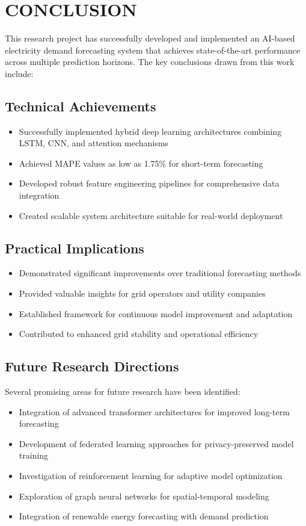 \documentclass[12pt,a4paper]{report}
\begin{document}
\chapter{CONCLUSION}
This research project has successfully developed and implemented an AI-based electricity demand forecasting system that achieves state-of-the-art performance across multiple prediction horizons. The key conclusions drawn from this work include:

\section{Technical Achievements}
\begin{itemize}
\item Successfully implemented hybrid deep learning architectures combining LSTM, CNN, and attention mechanisms
\item Achieved MAPE values as low as 1.75\% for short-term forecasting
\item Developed robust feature engineering pipelines for comprehensive data integration
\item Created scalable system architecture suitable for real-world deployment
\end{itemize}

\section{Practical Implications}
\begin{itemize}
\item Demonstrated significant improvements over traditional forecasting methods
\item Provided valuable insights for grid operators and utility companies
\item Established framework for continuous model improvement and adaptation
\item Contributed to enhanced grid stability and operational efficiency
\end{itemize}

\section{Future Research Directions}
Several promising areas for future research have been identified:

\begin{itemize}
\item Integration of advanced transformer architectures for improved long-term forecasting
\item Development of federated learning approaches for privacy-preserved model training
\item Investigation of reinforcement learning for adaptive model optimization
\item Exploration of graph neural networks for spatial-temporal modeling
\item Integration of renewable energy forecasting with demand prediction
\end{itemize}
\end{document}
